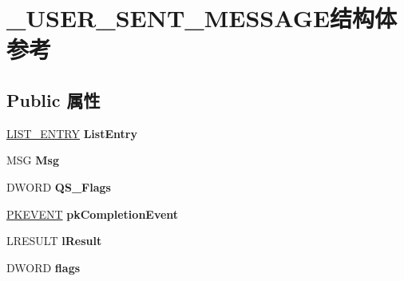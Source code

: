 \hypertarget{struct___u_s_e_r___s_e_n_t___m_e_s_s_a_g_e}{}\section{\+\_\+\+U\+S\+E\+R\+\_\+\+S\+E\+N\+T\+\_\+\+M\+E\+S\+S\+A\+G\+E结构体 参考}
\label{struct___u_s_e_r___s_e_n_t___m_e_s_s_a_g_e}
\subsection*{Public 属性}
\begin{DoxyCompactItemize}
\item 
\mbox{\label{struct___u_s_e_r___s_e_n_t___m_e_s_s_a_g_e_a1d56690b6ecb05b91a8f3a4410e225ec}} 
\hyperlink{struct___l_i_s_t___e_n_t_r_y}{L\+I\+S\+T\+\_\+\+E\+N\+T\+RY} {\bfseries List\+Entry}
\item 
\mbox{\label{struct___u_s_e_r___s_e_n_t___m_e_s_s_a_g_e_acdc15bf856f3e33b11985401121e6b5c}} 
M\+SG {\bfseries Msg}
\item 
\mbox{\label{struct___u_s_e_r___s_e_n_t___m_e_s_s_a_g_e_a7f761d5c6b82329f0489543636df89be}} 
D\+W\+O\+RD {\bfseries Q\+S\+\_\+\+Flags}
\item 
\mbox{\label{struct___u_s_e_r___s_e_n_t___m_e_s_s_a_g_e_a9959cc627733a6e6d65755f02c96c04a}} 
\hyperlink{struct___k_e_v_e_n_t}{P\+K\+E\+V\+E\+NT} {\bfseries pk\+Completion\+Event}
\item 
\mbox{\label{struct___u_s_e_r___s_e_n_t___m_e_s_s_a_g_e_a8a49b42d9ace74ead81856b8d228a743}} 
L\+R\+E\+S\+U\+LT {\bfseries l\+Result}
\item 
\mbox{\label{struct___u_s_e_r___s_e_n_t___m_e_s_s_a_g_e_a3f8b85516684e033dd1b415b5b0956d6}} 
D\+W\+O\+RD {\bfseries flags}
\item 
\mbox{\label{struct___u_s_e_r___s_e_n_t___m_e_s_s_a_g_e_aec63d5a131a3fdc315657156bd6151ed}} 

\end{DoxyCompactItemize}
